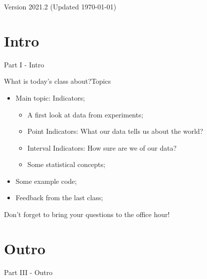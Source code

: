 \documentclass[aspectratio=169]{beamer}
\subtitle[Statistical Indicators]{Topic 02 - Point and Interval Indicators}
\begin{document}
\begin{CJK}{UTF8}{ipxm}

\begin{frame}
  \maketitle

  \vfill

  \hfill \tiny{Version 2021.2 (Updated \today)}
\end{frame}

\section{Intro}
\begin{frame}
  \begin{center}
    Part I - Intro
  \end{center}
\end{frame}

\begin{frame}{What is today's class about?}{Topics}
  \begin{itemize}
    \item Main topic: Indicators;
    \begin{itemize}
      \item A first look at data from experiments;
      \item Point Indicators: What our data tells us about the world?
      \item Interval Indicators: How sure are we of our data?
      \item Some statistical concepts;
    \end{itemize}\bigskip

    \item Some example code;\bigskip

    \item Feedback from the last class;
  \end{itemize}\bigskip

  Don't forget to bring your questions to the office hour!
\end{frame}



\section{Outro}
\begin{frame}
  \begin{center}
    Part III - Outro
  \end{center}
\end{frame}


\end{CJK}
\end{document}
